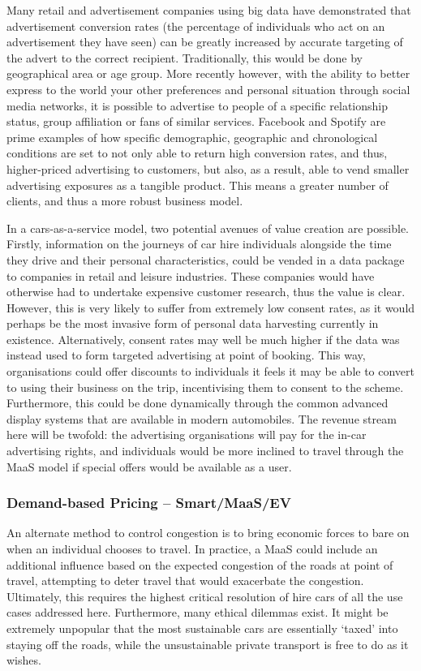 \documentclass[journal]{IEEEtran}
\begin{document}
Many retail and advertisement companies using big data have
demonstrated that advertisement conversion rates (the percentage of
individuals who act on an advertisement they have seen) can be greatly
increased by accurate targeting of the advert to the correct
recipient. Traditionally, this would be done by geographical area or
age group. More recently however, with the ability to better express
to the world your other preferences and personal situation through
social media networks, it is possible to advertise to people of a
specific relationship status, group affiliation or fans of similar
services. Facebook and Spotify are prime examples of how specific
demographic, geographic and chronological conditions are set to not
only able to return high conversion rates, and thus, higher-priced
advertising to customers, but also, as a result, able to vend smaller
advertising exposures as a tangible product. This means a greater
number of clients, and thus a more robust business model.

In a cars-as-a-service model, two potential avenues of value creation
are possible. Firstly, information on the journeys of car hire
individuals alongside the time they drive and their personal
characteristics, could be vended in a data package to companies in
retail and leisure industries. These companies would have otherwise
had to undertake expensive customer research, thus the value is
clear. However, this is very likely to suffer from extremely low
consent rates, as it would perhaps be the most invasive form of
personal data harvesting currently in existence. Alternatively,
consent rates may well be much higher if the data was instead used to
form targeted advertising at point of booking. This way, organisations
could offer discounts to individuals it feels it may be able to
convert to using their business on the trip, incentivising them to
consent to the scheme. Furthermore, this could be done dynamically
through the common advanced display systems that are available in
modern automobiles. The revenue stream here will be twofold: the
advertising organisations will pay for the in-car advertising rights,
and individuals would be more inclined to travel through the MaaS
model if special offers would be available as a user.


\subsubsection{Demand-based Pricing -- Smart/MaaS/EV}

An alternate method to control congestion is to bring economic forces
to bare on when an individual chooses to travel. In practice, a MaaS
could include an additional influence based on the expected congestion
of the roads at point of travel, attempting to deter travel that would
exacerbate the congestion. Ultimately, this requires the highest
critical resolution of hire cars of all the use cases addressed
here. Furthermore, many ethical dilemmas exist. It might be extremely
unpopular that the most sustainable cars are essentially `taxed' into
staying off the roads, while the unsustainable private transport is
free to do as it wishes.
\end{document}

